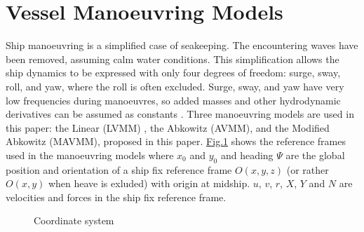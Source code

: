 \documentclass[review]{elsarticle}
\let\sphinxpxdimen\pdfpxdimen\else\newdimen\sphinxpxdimen
\begin{document}
\section{Vessel Manoeuvring Models}
\label{\detokenize{02.01_VMMs:vessel-manoeuvring-models}}\label{\detokenize{02.01_VMMs:vmm}}\label{\detokenize{02.01_VMMs::doc}}
\sphinxAtStartPar
Ship manoeuvring is a simplified case of seakeeping. The encountering waves have been removed, assuming calm water conditions. This simplification allows the ship dynamics to be expressed with only four degrees of freedom: surge, sway, roll, and yaw, where the roll is often excluded. Surge, sway, and yaw have very low frequencies during manoeuvres, so added masses and other hydrodynamic derivatives can be assumed as constants  \cite{fossen_handbook_2021}. Three manoeuvring models are used in this paper: the Linear (LVMM) \cite{matusiak_dynamics_2017}, the Abkowitz (AVMM), \cite{abkowitz_ship_1964} and the Modified Abkowitz (MAVMM), proposed in this paper.
\hyperref[\detokenize{02.01_VMMs:coordinate-system}]{Fig.\@ \ref{\detokenize{02.01_VMMs:coordinate-system}}} shows the reference frames used in the manoeuvring models where \(x_0\) and \(y_0\) and heading \(\Psi\) are the global position and orientation of a ship fix reference frame \(O(x,y,z)\) (or rather \(O(x,y)\) when heave is exluded) with origin at midship. \(u\), \(v\), \(r\), \(X\), \(Y\) and \(N\) are velocities and forces in the ship fix reference frame.

\begin{figure}[H]
\centering
\capstart

\noindent\sphinxincludegraphics[height=300\sphinxpxdimen]{{coordinate_system}.PNG}
\caption{Coordinate system}\label{\detokenize{02.01_VMMs:coordinate-system}}\end{figure}
\end{document}
